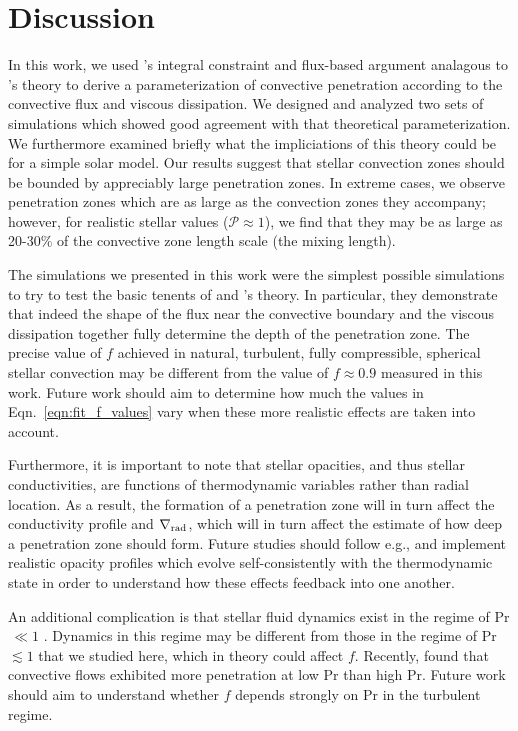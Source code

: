 \documentclass{aastex631}
\newcommand{\gradrad}{\ensuremath{\nabla_{\rm{rad}}}}
\newcommand{\mP}{\ensuremath{\mathcal{P}}}
\newcommand\Pran{\ensuremath{\mathrm{Pr}}}
\begin{document}
\section{Discussion}
\label{sec:discussion}
In this work, we used \citet{roxburgh1989}'s integral constraint and flux-based argument analagous to \citet{zahn1991}'s theory to derive a parameterization of convective penetration according to the convective flux and viscous dissipation.
We designed and analyzed two sets of simulations which showed good agreement with that theoretical parameterization.
We furthermore examined briefly what the impliciations of this theory could be for a simple solar model.
Our results suggest that stellar convection zones should be bounded by appreciably large penetration zones.
In extreme cases, we observe penetration zones which are as large as the convection zones they accompany; however, for realistic stellar values ($\mP \approx 1$), we find that they may be as large as 20-30\% of the convective zone length scale (the mixing length).

The simulations we presented in this work were the simplest possible simulations to try to test the basic tenents of \citet{roxburgh1989} and \citet{zahn1991}'s theory.
In particular, they demonstrate that indeed the shape of the flux near the convective boundary and the viscous dissipation together fully determine the depth of the penetration zone.
The precise value of $f$ achieved in natural, turbulent, fully compressible, spherical stellar convection may be different from the value of $f \approx 0.9$ measured in this work.
Future work should aim to determine how much the values in Eqn.~\ref{eqn:fit_f_values} vary when these more realistic effects are taken into account.

Furthermore, it is important to note that stellar opacities, and thus stellar conductivities, are functions of thermodynamic variables rather than radial location.
As a result, the formation of a penetration zone will in turn affect the conductivity profile and $\gradrad$, which will in turn affect the estimate of how deep a penetration zone should form.
Future studies should follow e.g., \citet{kapyla_etal_2017} and implement realistic opacity profiles which evolve self-consistently with the thermodynamic state in order to understand how these effects feedback into one another.

An additional complication is that stellar fluid dynamics exist in the regime of Pr$\,\ll1$ \citep{garaud2021}.
Dynamics in this regime may be different from those in the regime of Pr $\lesssim 1$ that we studied here, which in theory could affect $f$.
Recently, \citet{kapyla2021} found that convective flows exhibited more penetration at low Pr than high Pr.
Future work should aim to understand whether $f$ depends strongly on $\Pran$ in the turbulent regime.
\end{document}
